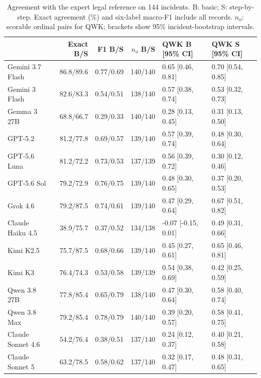 \begin{table}[!ht]
\centering
\caption{Agreement with the expert legal reference on 144 incidents. B: basic; S: step-by-step. Exact agreement (\%) and six-label macro-F1 include all records. $n_o$: scorable ordinal pairs for QWK; brackets show 95\% incident-bootstrap intervals.}
\label{tab:agreement}
\setlength{\tabcolsep}{4pt}
\small
\begin{tabular}{@{}lrrrll@{}}
\toprule
& Exact B/S & F1 B/S & $n_o$ B/S & QWK B [95\% CI] & QWK S [95\% CI] \\
\midrule
Gemini 3.7 Flash & 86.8/89.6 & 0.77/0.69 & 140/140 & 0.65 [0.46, 0.81] & 0.70 [0.54, 0.85] \\
Gemini 3 Flash & 82.6/83.3 & 0.54/0.51 & 138/140 & 0.57 [0.38, 0.74] & 0.53 [0.32, 0.73] \\
Gemma 3 27B & 68.8/66.7 & 0.29/0.33 & 140/140 & 0.28 [0.13, 0.45] & 0.31 [0.13, 0.50] \\
GPT-5.2 & 81.2/77.8 & 0.69/0.57 & 139/140 & 0.57 [0.39, 0.74] & 0.48 [0.30, 0.64] \\
GPT-5.6 Luna & 81.2/72.2 & 0.73/0.53 & 137/139 & 0.56 [0.39, 0.72] & 0.30 [0.12, 0.46] \\
GPT-5.6 Sol & 79.2/72.9 & 0.76/0.75 & 139/140 & 0.48 [0.30, 0.65] & 0.37 [0.20, 0.53] \\
Grok 4.6 & 79.2/87.5 & 0.74/0.61 & 139/140 & 0.47 [0.29, 0.64] & 0.67 [0.51, 0.82] \\
Claude Haiku 4.5 & 38.9/75.7 & 0.37/0.52 & 134/138 & -0.07 [-0.15, 0.01] & 0.49 [0.31, 0.66] \\
Kimi K2.5 & 75.7/87.5 & 0.68/0.66 & 139/140 & 0.45 [0.27, 0.61] & 0.65 [0.46, 0.81] \\
Kimi K3 & 76.4/74.3 & 0.53/0.58 & 139/139 & 0.54 [0.38, 0.69] & 0.42 [0.25, 0.59] \\
Qwen 3.8 27B & 77.8/85.4 & 0.65/0.79 & 138/140 & 0.47 [0.30, 0.64] & 0.58 [0.40, 0.74] \\
Qwen 3.8 Max & 79.2/85.4 & 0.78/0.79 & 140/140 & 0.39 [0.20, 0.57] & 0.58 [0.41, 0.75] \\
Claude Sonnet 4.6 & 54.2/76.4 & 0.38/0.51 & 137/140 & 0.24 [0.12, 0.37] & 0.40 [0.21, 0.58] \\
Claude Sonnet 5 & 63.2/78.5 & 0.58/0.62 & 137/140 & 0.32 [0.17, 0.47] & 0.48 [0.31, 0.65] \\
\bottomrule
\end{tabular}
\end{table}
